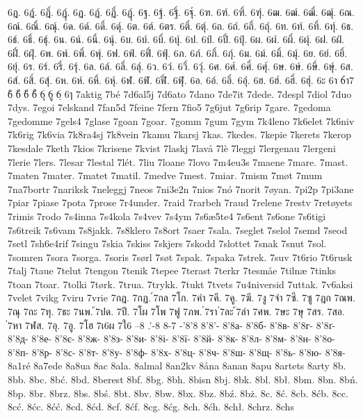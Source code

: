 6ฎ.
6ฎ์.
6ฎิ์.
6ฎุ์.
6ฏ.
6ฏ์.
6ฏิ์.
6ฏุ์.
6ฐ.
6ฐ์.
6ฐิ์.
6ฐุ์.
6ฑ.
6ฑ์.
6ฑิ์.
6ฑุ์.
6ฒ.
6ฒ์.
6ฒิ์.
6ฒุ์.
6ณ.
6ณ์.
6ณิ์.
6ณุ์.
6ด.
6ด์.
6ดิ์.
6ดุ์.
6ต.
6ต์.
6ตร.
6ติ์.
6ตุ์.
6ถ.
6ถ์.
6ถิ์.
6ถุ์.
6ท.
6ท์.
6ทิ์.
6ทุ์.
6ธ.
6ธ์.
6ธิ์.
6ธุ์.
6น.
6น์.
6นิ์.
6นุ์.
6บ.
6บ์.
6บิ์.
6บุ์.
6ป.
6ป์.
6ปิ์.
6ปุ์.
6ผ.
6ผ์.
6ผิ์.
6ผุ์.
6ฝ.
6ฝ์.
6ฝิ์.
6ฝุ์.
6พ.
6พ์.
6พิ์.
6พุ์.
6ฟ.
6ฟ์.
6ฟิ์.
6ฟุ์.
6ภ.
6ภ์.
6ภิ์.
6ภุ์.
6ม.
6ม์.
6มิ์.
6มุ์.
6ย.
6ย์.
6ยิ์.
6ยุ์.
6ร.
6ร์.
6ริ์.
6รุ์.
6ล.
6ล์.
6ลิ์.
6ลุ์.
6ว.
6ว์.
6วิ์.
6วุ์.
6ศ.
6ศ์.
6ศิ์.
6ศุ์.
6ษ.
6ษ์.
6ษิ์.
6ษุ์.
6ส.
6ส์.
6สิ์.
6สุ์.
6ห.
6ห์.
6หิ์.
6หุ์.
6ฬ.
6ฬ์.
6ฬิ์.
6ฬุ์.
6อ.
6อ์.
6อิ์.
6อุ์.
6ฮ.
6ฮ์.
6ฮิ์.
6ฮุ์.
6ะ
6า
6ำ7
6ิ
6ี
6ึ
6ื
6ุ
6ู
6ฺ
6ๅ
7aktig
7bé
7d6al5j
7d6ato
7dano
7de7it
7dede.
7despl
7diol
7duo
7dys.
7egoi
7elskand
7fan5d
7feine
7fern
7fio5
7g6jut
7g6rip
7gare.
7gedoma
7gedomme
7gels4
7glase
7goan
7goar.
7gomm
7gum
7gym
7k4leno
7k6elet
7k6niv
7k6rig
7k6via
7k8ra4sj
7k8vein
7kamu
7karsj
7kas.
7kedes.
7kepie
7kerets
7kerop
7kesdale
7keth
7kios
7krisene
7kvist
7laskj
7lavå
7lè
7leggi
7lergenau
7lergeni
7lerie
7lers.
7lesar
7lestal
7lét.
7liu
7loane
7lovo
7m4eu3s
7maene
7mare.
7mast.
7maten
7mater.
7matet
7matil.
7medve
7mest.
7miar.
7mism
7møt
7mum
7na7bortr
7nariksk
7neleggj
7neos
7ni3e2n
7nios
7nó
7norit
7øyan.
7pi2p
7pi3ane
7piar
7piase
7pota
7prose
7r4under.
7raid
7rarbeh
7raud
7relene
7restv
7retøyets
7rimis
7rodo
7s4inna
7s4kola
7s4vev
7s4ym
7s6æ5te4
7s6ent
7s6one
7s6tigi
7s6treik
7s6vam
7s8jakk.
7s8klero
7s8ort
7saer
7sala.
7seglet
7selol
7semd
7seod
7setl
7sh6e4rif
7singu
7skia
7skiss
7skjers
7skodd
7slottet
7snak
7snut
7sol.
7somren
7sora
7sorga.
7soris
7sørl
7søt
7spak.
7spaka
7strek.
7suv
7t6rio
7t6rusk
7talj
7taue
7telut
7tengon
7tenik
7tepee
7terast
7terkr
7tesmåe
7tilnæ
7tinks
7toan
7toar.
7tolki
7tørk.
7trua.
7trykk.
7tukt
7tvets
7u4niversid
7uttak.
7v6aksi
7velet
7vikg
7viru
7vrie
7กฎ.
7กฏ.
์7กล
7โก.
7คำ
7คี.
7คู.
7ฆี.
7งู
7จำ
7ซี.
7ซู
7ฎก
7ณพ.
7ณุ
7ถะ
7ทุ.
7ธะ
7นพ.
้7ปด.
7ปี.
7โผ
7โพ
7ฟู
7ภพ.
์7รา
่7ละ
้7ลำ
7ศพ.
7ษะ
7ษุ
7สร.
7สอ.
่7หา
7ฬส.
7อุ.
7อู.
7โฮ
7เ6ผ
7ใ6
--8
.'-8
8-7
-'8'8
8'8'-
8'8а-
8'8б-
8'8в-
8'8г-
8'8ґ-
8'8д-
8'8е-
8'8є-
8'8ж-
8'8з-
8'8и-
8'8і-
8'8ї-
8'8й-
8'8к-
8'8л-
8'8м-
8'8н-
8'8о-
8'8п-
8'8р-
8'8с-
8'8т-
8'8у-
8'8ф-
8'8х-
8'8ц-
8'8ч-
8'8ш-
8'8щ-
8'8ь-
8'8ю-
8'8я-
8a1ré
8a7ede
8a8ua
8ac
8ala.
8almal
8an2kv
8åna
8anan
8apu
8artets
8arty
8b.
8bb.
8bc.
8bć.
8bd.
8berest
8bf.
8bg.
8bh.
8bisn
8bj.
8bk.
8bl.
8bł.
8bm.
8bn.
8bń.
8bp.
8br.
8brz.
8bs.
8bś.
8bt.
8bv.
8bw.
8bx.
8bz.
8bź.
8bż.
8c.
8ć.
8cb.
8ćb.
8cc.
8cć.
8ćc.
8ćć.
8cd.
8ćd.
8cf.
8ćf.
8cg.
8ćg.
8ch.
8ćh.
8chł.
8chrz.
8chs
